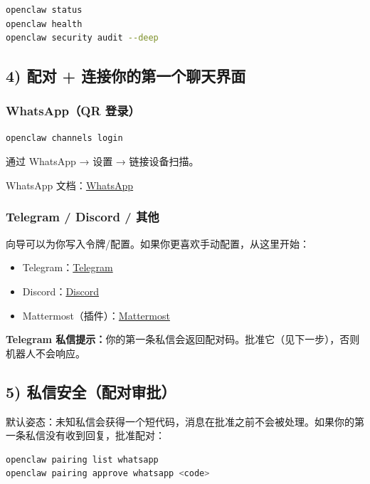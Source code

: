 \begin{lstlisting}[language=bash]
openclaw status
openclaw health
openclaw security audit --deep
\end{lstlisting}


\subsection{4) 配对 + 连接你的第一个聊天界面}


\subsubsection{WhatsApp（QR 登录）}


\begin{lstlisting}[language=bash]
openclaw channels login
\end{lstlisting}


通过 WhatsApp → 设置 → 链接设备扫描。

WhatsApp 文档：\href{/channels/whatsapp}{WhatsApp}

\subsubsection{Telegram / Discord / 其他}


向导可以为你写入令牌/配置。如果你更喜欢手动配置，从这里开始：

\begin{itemize}
  \item Telegram：\href{/channels/telegram}{Telegram}
  \item Discord：\href{/channels/discord}{Discord}
  \item Mattermost（插件）：\href{/channels/mattermost}{Mattermost}
\end{itemize}


\textbf{Telegram 私信提示：}你的第一条私信会返回配对码。批准它（见下一步），否则机器人不会响应。

\subsection{5) 私信安全（配对审批）}


默认姿态：未知私信会获得一个短代码，消息在批准之前不会被处理。如果你的第一条私信没有收到回复，批准配对：

\begin{lstlisting}[language=bash]
openclaw pairing list whatsapp
openclaw pairing approve whatsapp <code>
\end{lstlisting}


